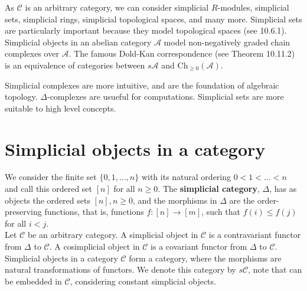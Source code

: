 As $\mathcal{C}$ is an arbitrary category, we can consider simplicial $R$-modules, simplicial sets, simplicial rings, simplicial topological spaces, and many more. Simplicial sets are particularly important because they model topological spaces (see 10.6.1). Simplicial objects in an abelian category $\mathcal{A}$ model non-negatively graded chain complexes over $\mathcal{A}$. The famous Dold-Kan correspondence (see Theorem 10.11.2) is an equivalence of categories between $s \mathcal{A}$ and $\mathrm{Ch}_{\geq 0}(\mathcal{A})$.

Simplicial complexes are more intuitive, and are the foundation of algebraic topology. $\Delta$-complexes are usueful for computations. Simplicial sets are more suitable to high level concepts.

\section{Simplicial objects in a category}

We consider the finite set $\{0,1, \ldots, n\}$ with its natural ordering $0<1<\ldots<n$ and call this ordered set $[n]$ for all $n \geq 0$. The \textbf{simplicial category}, $\Delta$, has as objects the ordered sets $[n], n \geq 0$, and the morphisms in $\Delta$ are the order-preserving functions, that is, functions $f:[n] \rightarrow[m]$, such that $f(i) \leq f(j)$ for all $i<j$.\\
Let $\mathcal{C}$ be an arbitrary category. A simplicial object in $\mathcal{C}$ is a contravariant functor from $\Delta$ to $\mathcal{C}$. A cosimplicial object in $\mathcal{C}$ is a covariant functor from $\Delta$ to $\mathcal{C}$.\\
Simplicial objects in a category $\mathcal{C}$ form a category, where the morphisms are natural transformations of functors. We denote this category by $s \mathcal{C}$, note that \cc can be embedded in $\mathcal{C}$, considering constant simplicial objects.\\




